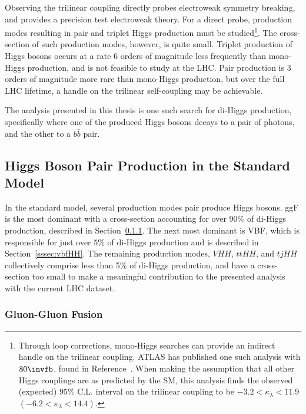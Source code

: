 Observing the trilinear coupling directly probes electroweak symmetry breaking, and provides a precision test electroweak theory. For a direct probe, production modes resulting in pair and triplet Higgs production must be studied\footnote{Through loop corrections, mono-Higgs searches can provide an indirect handle on the trilinear coupling. ATLAS has published one such analysis with $\unit{80}{\invfb}$, found in Reference~\cite{monohiggs-selfcoupling}. When making the assumption that all other Higgs couplings are as predicted by the \gls{SM}, this analysis finds the observed (expected) $95\%$ C.L. interval on the trilinear coupling to be $-3.2 < \kappa_\lambda <11.9$   $(-6.2 < \kappa_\lambda <14.4)$.}. The cross-section of such production modes, however, is quite small. Triplet production of Higgs bosons occurs at a rate 6 orders of magnitude less frequently than mono-Higgs production, and is not feasible to study at the \gls{LHC}. Pair production is 3 orders of magnitude more rare than mono-Higgs production, but over the full \gls{LHC} lifetime, a handle on the trilinear self-coupling may be achievable.

The analysis presented in this thesis is one such search for di-Higgs production, specifically where one of the produced Higgs bosons decays to a pair of photons, and the other to a $b\bar{b}$ pair.

\subsection{Higgs Boson Pair Production in the Standard Model}
In the standard model, several production modes pair produce Higgs bosons. \gls{ggF} is the most dominant with a cross-section accounting for over $90\%$ of di-Higgs production, described in Section~\ref{sssec:ggfHH}. The next most dominant is \gls{VBF}, which is responsible for just over $5\%$ of di-Higgs production and is described in Section~\ref{sssec:vbfHH}. The remaining production modes, $VHH$, $ttHH$, and $tjHH$ collectively comprise less than 5\% of di-Higgs production, and have a cross-section too small to make a meaningful contribution to the presented analysis with the current \gls{LHC} dataset.

\subsubsection{Gluon-Gluon Fusion}\label{sssec:ggfHH}

